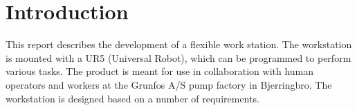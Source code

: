 \chapter{Introduction} \label{ch:introduction}

This report describes the development of a flexible work station. The workstation is mounted with a UR5 (Universal Robot), which can be programmed to perform various tasks. The product is meant for use in collaboration with human operators and workers at the Grunfos A/S pump factory in Bjerringbro. The workstation is designed based on a number of requirements. 
